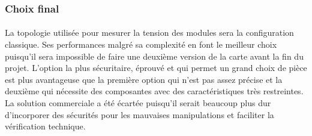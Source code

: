 	\subsubsection*{Choix final}
	\paragraph*{}	
	La topologie utilisée pour mesurer la tension des modules sera la configuration classique. Ses performances malgré sa complexité en font le meilleur choix puisqu'il sera impossible de faire une deuxième version de la carte avant la fin du projet. L'option la plus sécuritaire, éprouvé et qui permet un grand choix de pièce est plus avantageuse que la première option qui n'est pas assez précise et la deuxième qui nécessite des composantes avec des caractéristiques très restreintes. La solution commerciale a été écartée puisqu'il serait beaucoup plus dur d'incorporer des sécurités pour les mauvaises manipulations et faciliter la vérification technique.	